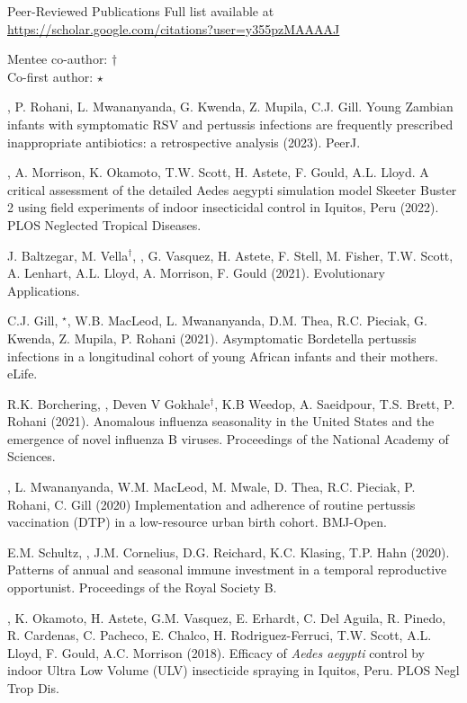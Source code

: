 \documentclass{resume} %
\begin{document}
\begin{rSection}{Peer-Reviewed Publications}
Full list available at \url{https://scholar.google.com/citations?user=y355pzMAAAAJ} 

Mentee co-author: $\dagger$
\\Co-first author: $\star$

\authSelf, P. Rohani, L. Mwananyanda, G. Kwenda, Z. Mupila, C.J. Gill.
Young Zambian infants with symptomatic RSV and pertussis infections are frequently prescribed inappropriate antibiotics: a retrospective analysis (2023).
PeerJ.

\authSelf, A. Morrison, K. Okamoto, T.W. Scott, H. Astete, F. Gould,
A.L. Lloyd. A critical assessment of the detailed Aedes aegypti simulation model Skeeter Buster 2 using field experiments of indoor insecticidal control in Iquitos, Peru (2022).
PLOS Neglected Tropical Diseases.

J. Baltzegar, M. Vella$^\dagger$, \authSelf, G. Vasquez, H. Astete, F. Stell, M. Fisher, T.W. Scott, A. Lenhart, A.L. Lloyd, A. Morrison, F. Gould (2021). Evolutionary Applications.

C.J. Gill, \authSelf$^\star$, W.B. MacLeod, L. Mwananyanda, D.M. Thea, R.C. Pieciak, G. Kwenda, Z. Mupila, P. Rohani (2021).  Asymptomatic Bordetella pertussis infections in a longitudinal cohort of young African infants and their mothers. eLife.

R.K. Borchering, \authSelf, Deven V Gokhale$^\dagger$, K.B Weedop, A. Saeidpour, T.S. Brett, P. Rohani (2021).
Anomalous influenza seasonality in the United States and the emergence of novel influenza B viruses. Proceedings of the National Academy of Sciences.

\authSelf, L. Mwananyanda, W.M. MacLeod, M. Mwale, D. Thea, R.C.  Pieciak, P. Rohani, C. Gill (2020)
Implementation and adherence of routine pertussis vaccination (DTP) in a low-resource urban birth cohort. BMJ-Open.

E.M. Schultz, \authSelf, J.M. Cornelius, D.G. Reichard, K.C. Klasing, T.P. Hahn (2020). Patterns of annual and seasonal immune investment in a temporal reproductive opportunist. Proceedings of the Royal Society B.

\authSelf, K. Okamoto, H. Astete, G.M. Vasquez, E. Erhardt, 
C. Del Aguila, R. Pinedo, R. Cardenas, C. Pacheco, E. Chalco, 
H. Rodriguez-Ferruci, T.W. Scott, A.L. Lloyd, F. Gould, A.C. Morrison (2018).
Efficacy of {\em Aedes aegypti} control by indoor Ultra Low Volume (ULV)
insecticide spraying in Iquitos, Peru. PLOS Negl Trop Dis.


\end{rSection}
\end{document}
